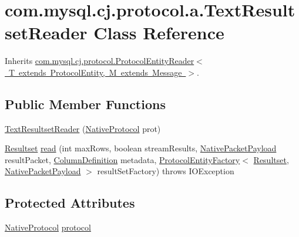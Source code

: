 \hypertarget{classcom_1_1mysql_1_1cj_1_1protocol_1_1a_1_1_text_resultset_reader}{}\section{com.\+mysql.\+cj.\+protocol.\+a.\+Text\+Resultset\+Reader Class Reference}
\label{classcom_1_1mysql_1_1cj_1_1protocol_1_1a_1_1_text_resultset_reader}


Inherits \mbox{\hyperlink{interfacecom_1_1mysql_1_1cj_1_1protocol_1_1_protocol_entity_reader}{com.\+mysql.\+cj.\+protocol.\+Protocol\+Entity\+Reader$<$ T extends Protocol\+Entity, M extends Message $>$}}.

\subsection*{Public Member Functions}
\begin{DoxyCompactItemize}
\item 
\mbox{\hyperlink{classcom_1_1mysql_1_1cj_1_1protocol_1_1a_1_1_text_resultset_reader_a215ac606c36c82b8ce20544d5f46e3c0}{Text\+Resultset\+Reader}} (\mbox{\hyperlink{classcom_1_1mysql_1_1cj_1_1protocol_1_1a_1_1_native_protocol}{Native\+Protocol}} prot)
\item 
\mbox{\hyperlink{interfacecom_1_1mysql_1_1cj_1_1protocol_1_1_resultset}{Resultset}} \mbox{\hyperlink{classcom_1_1mysql_1_1cj_1_1protocol_1_1a_1_1_text_resultset_reader_af5348f629df11c452f14ca207e33177d}{read}} (int max\+Rows, boolean stream\+Results, \mbox{\hyperlink{classcom_1_1mysql_1_1cj_1_1protocol_1_1a_1_1_native_packet_payload}{Native\+Packet\+Payload}} result\+Packet, \mbox{\hyperlink{interfacecom_1_1mysql_1_1cj_1_1protocol_1_1_column_definition}{Column\+Definition}} metadata, \mbox{\hyperlink{interfacecom_1_1mysql_1_1cj_1_1protocol_1_1_protocol_entity_factory}{Protocol\+Entity\+Factory}}$<$ \mbox{\hyperlink{interfacecom_1_1mysql_1_1cj_1_1protocol_1_1_resultset}{Resultset}}, \mbox{\hyperlink{classcom_1_1mysql_1_1cj_1_1protocol_1_1a_1_1_native_packet_payload}{Native\+Packet\+Payload}} $>$ result\+Set\+Factory)  throws I\+O\+Exception 
\end{DoxyCompactItemize}
\subsection*{Protected Attributes}
\begin{DoxyCompactItemize}
\item 
\mbox{\hyperlink{classcom_1_1mysql_1_1cj_1_1protocol_1_1a_1_1_native_protocol}{Native\+Protocol}} \mbox{\hyperlink{classcom_1_1mysql_1_1cj_1_1protocol_1_1a_1_1_text_resultset_reader_a6cde3936e649aa072e3b844e3efd48bc}{protocol}}
\end{DoxyCompactItemize}


